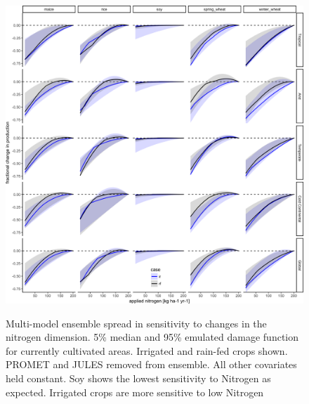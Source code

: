 \documentclass[10pt]{article}
\begin{document}
{\begin{figure}[h!]
\includegraphics[width=\textwidth]{s_nitrogen.png}\\
\caption{Multi-model ensemble spread in sensitivity to changes in the nitrogen dimension. 5\% median and 95\% emulated damage function for currently cultivated areas. Irrigated and rain-fed crops shown. PROMET and JULES removed from ensemble. All other covariates held constant. Soy shows the lowest sensitivity to Nitrogen as expected. Irrigated crops are more sensitive to low Nitrogen}
\label{fig:nitrogen}
\end{figure}

}
\end{document}
